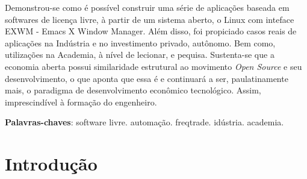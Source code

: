 \documentclass[
12pt,				%
openright,			%
oneside,			%
a4paper,			%
english,			%
french,				%
spanish,			%
brazil,				%
]{abntex2}
\begin{document}

\frenchspacing


\imprimircapa


\setlength{\absparsep}{18pt} %
\begin{resumo}

  Demonstrou-se como é possível construir uma série de aplicações
  baseada em softwares de licença livre, à partir de um sistema
  aberto, o Linux com inteface EXWM - Emacs X Window Manager. Além
  disso, foi propiciado casos reais de aplicações na Indústria e no
  investimento privado, autônomo. Bem como, utilizações na Academia,
  à nível de lecionar, e pequisa. Sustenta-se que a economia aberta
  possui similaridade estrutural ao movimento \textit{Open Source} e
  seu desenvolvimento, o que aponta que essa é e continuará a ser,
  paulatinamente mais, o paradigma de desenvolvimento econômico
  tecnológico. Assim, imprescindível à formação do engenheiro.
  
  \noindent
  \textbf{Palavras-chaves}: software livre. automação. freqtrade. idústria. academia.

\end{resumo}


\listoffigures*
\cleardoublepage

\tableofcontents*


\textual

\chapter[Introdução]{Introdução}
\end{document}
